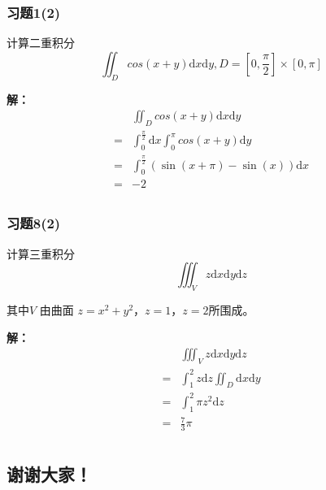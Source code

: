 \documentclass[xetex]{beamer}
\begin{document}
	\begin{frame}
		\frametitle{习题1(2)}
		计算二重积分
		\begin{equation*}
			\iint_D cos(x + y) \mathrm{d}x \mathrm{d}y, D = [0, \frac{\pi}{2}] \times [0, \pi]
		\end{equation*}
		
		\textbf{解：}
			\begin{equation*}
				\begin{split}
				& \iint_D cos(x + y) \mathrm{d}x \mathrm{d}y \\
			=   & \int_{0}^{\frac{\pi}{2}} \mathrm{d}x \int_{0}^{\pi} cos(x + y) \mathrm{d} y\\ 
			=   & \int_{0}^{\frac{\pi}{2}} (\sin (x + \pi) - \sin (x)) \mathrm{d} x\\
			=   & -2\\
				\end{split}
			\end{equation*}
	\end{frame}
	\begin{frame}
		\frametitle{习题8(2)}
		计算三重积分
		\begin{equation*}
			\iiint_V z \mathrm{d}x \mathrm{d}y \mathrm{d}z
		\end{equation*}
		
		其中$V$ 由曲面 $z = x^2 + y^2$，$z = 1$，$z = 2$所围成。
		
		\textbf{解：}
		\begin{equation*}
			\begin{split}
					& \iiint_V z \mathrm{d}x \mathrm{d}y \mathrm{d}z \\
				=   & \int_{1}^{2} z \mathrm{d}z \iint_D \mathrm{d}x \mathrm{d}y \\
				=	& \int_{1}^{2} \pi z^2 \mathrm{d}z\\
				=   & \frac{7}{3} \pi \\
			\end{split}
		\end{equation*}
	\end{frame}
	
	\begin{frame}
		\section{谢谢大家！}
	\end{frame}
\end{document}
